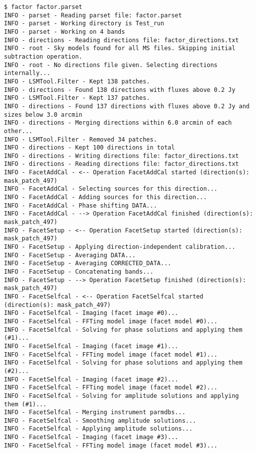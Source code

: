 \documentclass[structabstract]{article}
\begin{document}
{\begin{verbatim}
$ factor factor.parset
INFO - parset - Reading parset file: factor.parset
INFO - parset - Working directory is Test_run
INFO - parset - Working on 4 bands
INFO - directions - Reading directions file: factor_directions.txt
INFO - root - Sky models found for all MS files. Skipping initial subtraction operation.
INFO - root - No directions file given. Selecting directions internally...
INFO - LSMTool.Filter - Kept 138 patches.
INFO - directions - Found 138 directions with fluxes above 0.2 Jy
INFO - LSMTool.Filter - Kept 137 patches.
INFO - directions - Found 137 directions with fluxes above 0.2 Jy and sizes below 3.0 arcmin
INFO - directions - Merging directions within 6.0 arcmin of each other...
INFO - LSMTool.Filter - Removed 34 patches.
INFO - directions - Kept 100 directions in total
INFO - directions - Writing directions file: factor_directions.txt
INFO - directions - Reading directions file: factor_directions.txt
INFO - FacetAddCal - <-- Operation FacetAddCal started (direction(s): mask_patch_497)
INFO - FacetAddCal - Selecting sources for this direction...
INFO - FacetAddCal - Adding sources for this direction...
INFO - FacetAddCal - Phase shifting DATA...
INFO - FacetAddCal - --> Operation FacetAddCal finished (direction(s): mask_patch_497)
INFO - FacetSetup - <-- Operation FacetSetup started (direction(s): mask_patch_497)
INFO - FacetSetup - Applying direction-independent calibration...
INFO - FacetSetup - Averaging DATA...
INFO - FacetSetup - Averaging CORRECTED_DATA...
INFO - FacetSetup - Concatenating bands...
INFO - FacetSetup - --> Operation FacetSetup finished (direction(s): mask_patch_497)
INFO - FacetSelfcal - <-- Operation FacetSelfcal started (direction(s): mask_patch_497)
INFO - FacetSelfcal - Imaging (facet image #0)...
INFO - FacetSelfcal - FFTing model image (facet model #0)...
INFO - FacetSelfcal - Solving for phase solutions and applying them (#1)...
INFO - FacetSelfcal - Imaging (facet image #1)...
INFO - FacetSelfcal - FFTing model image (facet model #1)...
INFO - FacetSelfcal - Solving for phase solutions and applying them (#2)...
INFO - FacetSelfcal - Imaging (facet image #2)...
INFO - FacetSelfcal - FFTing model image (facet model #2)...
INFO - FacetSelfcal - Solving for amplitude solutions and applying them (#1)...
INFO - FacetSelfcal - Merging instrument parmdbs...
INFO - FacetSelfcal - Smoothing amplitude solutions...
INFO - FacetSelfcal - Applying amplitude solutions...
INFO - FacetSelfcal - Imaging (facet image #3)...
INFO - FacetSelfcal - FFTing model image (facet model #3)...

\end{verbatim}}
\end{document}
